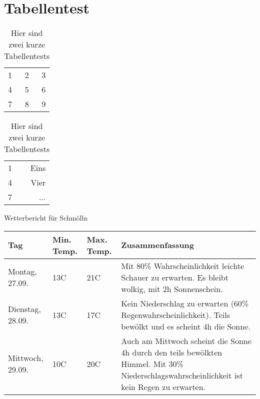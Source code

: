 \section{Tabellentest}

\begin{table} [htb]				%
\begin{tabular}{ l | c ||r }


\hline							%
1 & 2 & 3 \\
4 & 5 & 6 \\
7 & 8 & 9 \\
\hline

\end{tabular}

\begin{tabular}{| l | r |}

\hline					
1 & Eins \\
4 & Vier \\ \cline{2-2}			%
7 & ... \\
\hline \hline					%

\end{tabular}
\caption{Hier sind zwei kurze Tabellentests}	%
\label{tabellentests}			%
\end{table}

Wetterbericht für Schmölln

\begin{tabular}{| l | l | l | p{5cm} |}

\hline
Tag & Min. Temp. & Max. Temp. & Zusammenfassung\\
\hline \hline
Montag, 27.09. & 13C & 21C & Mit 80\% Wahrscheinlichkeit leichte Schauer zu erwarten. Es bleibt wolkig, mit 2h Sonnenschein.\\
\hline
Dienstag, 28.09. & 13C & 17C & Kein Niederschlag zu erwarten (60\% Regenwahrscheinlichkeit). Teils bewölkt und es scheint 4h die Sonne.\\
\hline
Mittwoch, 29.09. & 10C & 20C & Auch am Mittwoch scheint die Sonne 4h durch den teils bewölkten Himmel. Mit 30\% Niederschlagswahrscheinlichkeit ist kein Regen zu erwarten.\\
\hline

\end{tabular}

